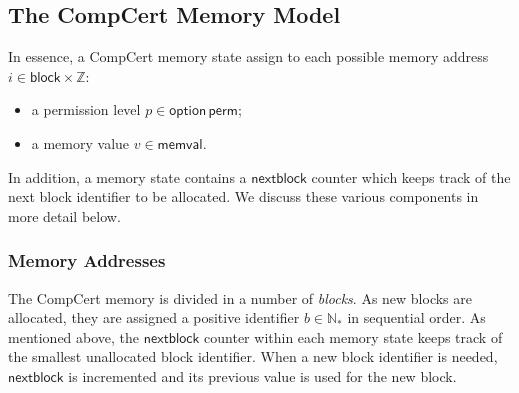 \documentclass[acmsmall,screen,review,anonymous,nonacm]{acmart}
\newcommand{\kw}[1]{\ensuremath{ \mathsf{#1} }}
\begin{document}


\subsection{The CompCert Memory Model}

In essence,
a CompCert memory state
assign to each possible memory address $i \in \kw{block} \times \mathbb{Z}$:
\begin{itemize}
  \item a permission level $p \in \kw{option}\,\kw{perm}$;
  \item a memory value $v \in \kw{memval}$.
\end{itemize}
In addition,
a memory state contains a $\kw{nextblock}$ counter
which keeps track of the next block identifier to be allocated.
We discuss these various components in more detail below.

\subsubsection{Memory Addresses}

The CompCert memory is divided in a number of \emph{blocks}.
As new blocks are allocated,
they are assigned a positive identifier $b \in \mathbb{N}_*$
in sequential order.
As mentioned above,
the $\kw{nextblock}$ counter within each memory state
keeps track of the smallest unallocated block identifier.
When a new block identifier is needed,
$\kw{nextblock}$ is incremented and its previous value
is used for the new block.
\end{document}
